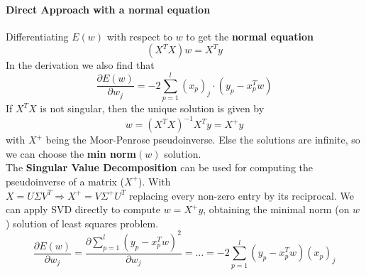 \documentclass[10pt]{report}
\begin{document}
\paragraph{Direct Approach with a normal equation} Differentiating $E(w)$ with respect to $w$ to get the \textbf{normal equation} $$(X^T X)w = X^T y$$
In the derivation we also find that $$\frac{\partial E(w)}{\partial w_j} = -2 \sum_{p=1}^l (x_p)_j \cdot (y_p - x_p^T w)$$
If $X^T X$ is not singular, then the unique solution is given by $$w = (X^T X)^{-1}X^T y = X^+ y$$ with $X^+$ being the Moor-Penrose pseudoinverse. Else the solutions are infinite, so we can choose the \textbf{min norm}$(w)$ solution.\\
The \textbf{Singular Value Decomposition} can be used for computing the pseudoinverse of a matrix ($X^+$). With\\ $X = U\Sigma V^T \Rightarrow X^+ = V\Sigma^+ U^T$ replacing every non-zero entry by its reciprocal. We can apply SVD directly to compute $w = X^+ y$, obtaining the minimal norm (on $w$) solution of least squares problem.
$$\frac{\partial E(w)}{\partial w_j} = \frac{\partial \sum_{p=1}^l (y_p - x_p^T w)^2}{\partial w_j} = \ldots = -2 \sum_{p=1}^l (y_p - x_p^T w)(x_p)_j$$
\end{document}
